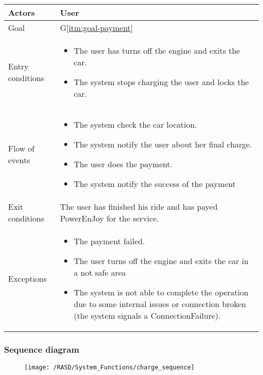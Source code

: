 \begin{center}
  \begin{tabular}{ l | p{10cm} }
    \hline
    Actors & User\\ \hline
    Goal & G\ref{itm:goal-payment}\\ \hline
    Entry conditions & 
    \begin{itemize}
    \item The user has turns off the engine and exits the car.
    \item The system stops charging the user and locks the car.
    \end{itemize} \\ \hline
    Flow of events &
\begin{itemize}
\item The system check the car location.
\item The system notify the user about her final charge.
\item The user does the payment.
\item The system notify the success of the payment
\end{itemize} \\ \hline
    Exit conditions & The user has finished his ride and has payed PowerEnJoy for the service. \\ \hline
  Exceptions & 
\begin{itemize}
\item The payment failed.
\item The user turns off the engine and exits the car in a not safe area
\item The system is not able to complete the operation due to some internal issues or connection broken (the system signals a ConnectionFailure).%
\end{itemize} \\ \hline
  \end{tabular}
\end{center}


\newpage
\subsubsection{Sequence diagram}
\begin{figure}[!ht]
  \centering
  \vspace{0.1cm}
  \texttt{[image: /RASD/System\_Functions/charge\_sequence]}\\
  \vspace{0.1cm}
  \label{fig:charge_sequence} 
\end{figure}

